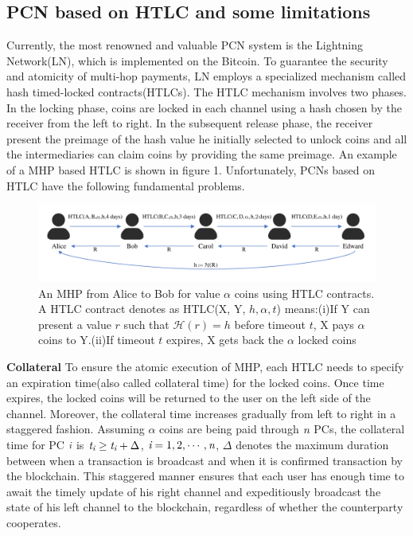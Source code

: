 \documentclass[conference]{IEEEtran}
\begin{document}
\subsection{PCN based on HTLC and some limitations}
Currently, the most renowned and valuable PCN system is the Lightning Network(LN), which is implemented on 
the Bitcoin. To guarantee the security and atomicity of multi-hop payments, LN employs a specialized mechanism called
hash timed-locked contracts(HTLCs). The HTLC mechanism involves two phases. In the locking phase, coins are locked in each 
channel using a hash chosen by the receiver from the left to right. In the subsequent release phase, the receiver present the preimage of the hash
value he initially selected to unlock coins and all the intermediaries can claim coins by providing the same preimage. An example of a MHP based
HTLC is shown in figure 1. Unfortunately, PCNs based on HTLC have the following fundamental problems.

\begin{figure}[b]
    \centering
    \includegraphics[scale=0.35]{htlc.pdf}
    \caption{An MHP from Alice to Bob for value $\alpha$ coins using HTLC contracts. A HTLC contract denotes as 
    HTLC(X, Y, $h, \alpha, t$) means:(i)If Y can present a value $r$ such that $\mathcal{H}(r)=h$ before timeout $t$,
    X pays $\alpha$ coins to Y.(ii)If timeout $t$ expires, X gets back the $\alpha$ locked coins}
\end{figure}

\textbf{Collateral} To ensure the atomic execution of MHP, each HTLC needs to specify an expiration time(also called collateral time) for the locked 
coins. Once time expires, the locked coins will be returned to the user on the left side of the channel. Moreover, the collateral time increases gradually
from left to right in a staggered fashion. Assuming $\alpha$ coins are being paid through $\emph{n}$ PCs, the collateral time for 
PC $\emph{i}$ is $\emph{t}_{\emph{i}}\geq\emph{t}_{\emph{i}}+\Delta$, $\emph{i}=1,2,\cdots ,\emph{n}$, $\Delta$ denotes
the maximum duration between when a transaction is broadcast and when it is confirmed transaction by the blockchain. This staggered manner
ensures that each user has enough time to await the timely update of his right channel and expeditiously broadcast the state of his left channel to
the blockchain, regardless of whether the counterparty cooperates. 
\end{document}
